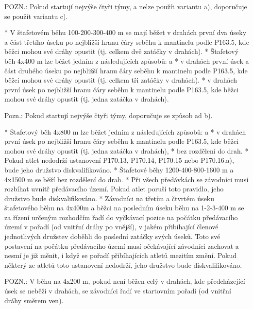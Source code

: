 POZN.: Pokud startují nejvýše čtyři týmy, a nelze použít variantu a), doporučuje se použít variantu c).

* V štafetovém běhu 100-200-300-400 m se mají běžet v drahách první dva úseky a část třetího úseku po nejbližší hranu čáry seběhu k mantinelu podle P163.5, kde běžci mohou své dráhy opustit (tj. celkem dvě zatáčky v drahách).
* Štafetový běh 4x400 m lze běžet jedním z následujících způsobů:
  \begitems \style a
  * v drahách první úsek a část druhého úseku po nejbližší hranu čáry seběhu k mantinelu podle P163.5, kde běžci mohou své dráhy opustit (tj. celkem tři zatáčky v drahách).
  * v drahách první úsek po nejbližší hranu čáry seběhu k mantinelu podle P163.5, kde běžci mohou své dráhy opustit (tj. jedna zatáčka v drahách).
  \enditems

Pozn.: Pokud startují nejvýše čtyři týmy, doporučuje se způsob ad b).

* Štafetový běh 4x800 m lze běžet jedním z následujících způsobů:
  \begitems \style a
  * v drahách první úsek po nejbližší hranu čáry seběhu k mantinelu podle P163.5, kde běžci mohou své dráhy opustit (tj. jedna zatáčka v drahách),
  * bez rozdělení do drah.
  \enditems
* Pokud atlet nedodrží ustanovení P170.13, P170.14, P170.15 nebo P170.16.a), bude jeho družstvo diskvalifikováno.
* Štafetové běhy 1200-400-800-1600 m a 4x1500 m se běží bez rozdělení do drah.
* Při všech předávkách se závodníci musí rozbíhat uvnitř předávacího území. Pokud atlet poruší toto pravidlo, jeho družstvo bude diskvalifikováno.
* Závodníci na třetím a čtvrtém úseku štafetového běhu na 4x400m a běžci na posledním úseku běhu na 1-2-3-400 m se za řízení určeným rozhodčím řadí do vyčkávací pozice na počátku předávacího území v pořadí (od vnitřní dráhy po vnější), v jakém přibíhající členové jednotlivých družstev doběhli do poslední zatáčky svých úseků. Toto své postavení na počátku předávacího území musí očekávající závodníci zachovat a nesmí je již měnit, i když se pořadí přibíhajících atletů mezitím změní. Pokud některý ze atletů toto ustanovení nedodrží, jeho družstvo bude diskvalifikováno.

POZN.: V běhu na 4x200 m, pokud není běžen celý v drahách, kde předcházející úsek se neběží v drahách, se závodníci řadí ve startovním pořadí (od vnitřní dráhy směrem ven).

